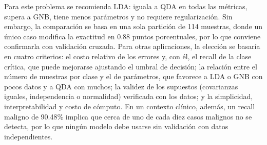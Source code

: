 Para este problema se recomienda LDA: iguala a QDA en todas las métricas, supera a GNB, tiene menos parámetros y no requiere regularización. Sin embargo, la comparación se basa en una sola partición de 114 muestras, donde un único caso modifica la exactitud en 0.88 puntos porcentuales, por lo que conviene confirmarla con validación cruzada. Para otras aplicaciones, la elección se basaría en cuatro criterios: el costo relativo de los errores y, con él, el recall de la clase crítica, que puede mejorarse ajustando el umbral de decisión; la relación entre el número de muestras por clase y el de parámetros, que favorece a LDA o GNB con pocos datos y a QDA con muchos; la validez de los supuestos (covarianzas iguales, independencia o normalidad) verificada con los datos; y la simplicidad, interpretabilidad y costo de cómputo. En un contexto clínico, además, un recall maligno de 90.48\% implica que cerca de uno de cada diez casos malignos no se detecta, por lo que ningún modelo debe usarse sin validación con datos independientes.
